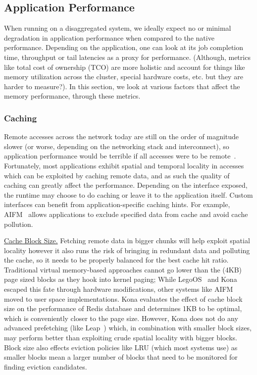 
\subsection{Application Performance}
\label{sec:performance}
When running on a disaggregated system, we ideally expect 
no or minimal degradation in application performance 
when compared to the native performance. Depending 
on the application, one can look at its job completion time, 
throughput or tail latencies as a proxy for performance. 
(Although, metrics like total cost of ownership (TCO) are 
more holistic and account for things like memory 
utilization across the cluster, special hardware costs, etc.
but they are harder to measure?). In this section, we 
look at various factors that affect the memory performance,
through these metrics.


\subsubsection{Caching}
Remote accesses across the network today are still on 
the order of magnitude slower (or worse, depending on the 
networking stack and interconnect), so application 
performance would be terrible if all accesses were 
to be remote~\cite{netdisagg}. Fortunately, most 
applications exhibit spatial and temporal locality 
in accesses which can be exploited by caching 
remote data, and as such the quality of caching can 
greatly affect the performance. Depending on the 
interface exposed, the runtime may choose to do 
caching or leave it to the application itself. 
Custom interfaces can benefit from application-specific 
caching hints. For example, AIFM~\cite{aifm} allows 
applications to exclude specified data from cache 
and avoid cache pollution. 

\vspace{3pt}
\noindent \uline{Cache Block Size.} Fetching remote data in 
bigger chunks will help exploit spatial locality 
however it also runs the risk of bringing in redundant data 
and polluting the cache, so it needs to be properly 
balanced for the best cache hit ratio. Traditional
virtual memory-based approaches cannot go lower than 
the (4KB) page sized blocks as they hook into kernel 
paging; While LegoOS~\cite{legoos} and Kona~\cite{kona} 
escaped this fate through hardware modifications, 
other systems like AIFM~\cite{aifm} moved to user 
space implementations. Kona evaluates the effect of 
cache block size on the performance of Redis database 
and determines 1KB to be optimal, which is conveniently 
closer to the page size. However, Kona does not do any 
advanced prefetching (like Leap~\cite{leap}) which, in 
combination with smaller block sizes, may perform better 
than exploiting crude spatial locality with bigger blocks.
Block size also effects eviction policies like LRU (which
most systems use) as smaller blocks mean a larger number 
of blocks that need to be monitored for finding eviction
candidates. 

